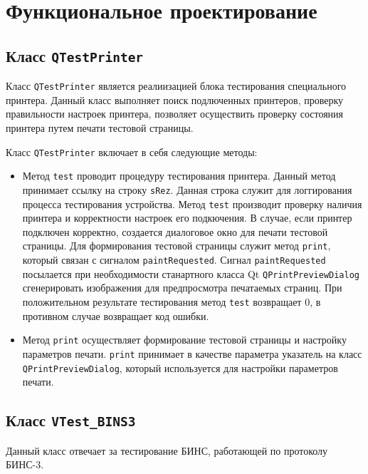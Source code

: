 \section{Функциональное проектирование}
\label{sec:func}

\subsection{Класс \texttt{QTestPrinter}}
Класс \texttt{QTestPrinter} является реалиизацией блока тестирования специального принтера.
Данный класс выполняет поиск подлюченных принтеров, проверку правильности настроек принтера,
позволяет осуществить проверку состояния принтера путем печати тестовой страницы.

Класс \texttt{QTestPrinter} включает в себя следующие методы:

\begin{itemize}
	\item Метод \texttt{test} проводит процедуру тестирования принтера. Данный метод принимает ссылку на строку
		\texttt{sRez}. Данная строка служит для логгирования процесса тестирования устройства. Метод \texttt{test} производит
		проверку наличия принтера и корректности настроек его подкючения. В случае, если принтер подключен корректно, создается
		диалоговое окно для печати тестовой страницы. Для формирования тестовой страницы служит метод \texttt{print}, который
		связан с сигналом \texttt{paintRequested}. Сигнал \break\texttt{paintRequested} посылается при необходимости станартного
		класса Qt \texttt{QPrintPreviewDialog} сгенерировать изображения для предпросмотра печатаемых страниц. При положительном
		результате тестирования метод \texttt{test} возвращает 0, в противном случае возвращает код ошибки.

	\item Метод \texttt{print} осуществляет формирование тестовой страницы и настройку параметров печати. \texttt{print}
		принимает в качестве параметра указатель на класс \texttt{QPrintPreviewDialog}, который используется для настройки
		параметров печати.
\end{itemize}

\subsection{Класс \texttt{VTest\_BINS3}}
Данный класс отвечает за тестирование БИНС, работающей по протоколу БИНС-3.

